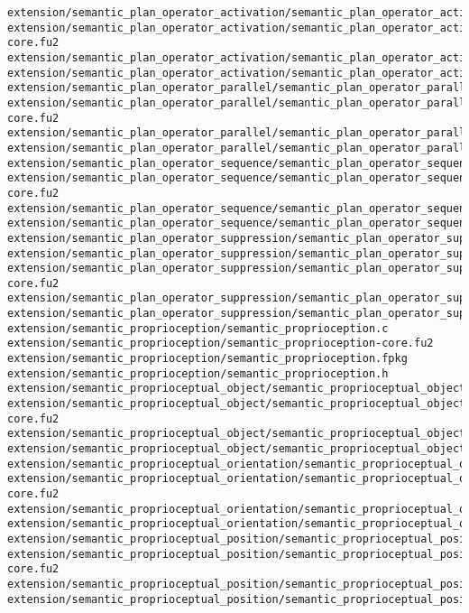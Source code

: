 \begin{lstlisting}
extension/semantic_plan_operator_activation/semantic_plan_operator_activation.c
extension/semantic_plan_operator_activation/semantic_plan_operator_activation-core.fu2
extension/semantic_plan_operator_activation/semantic_plan_operator_activation.fpkg
extension/semantic_plan_operator_activation/semantic_plan_operator_activation.h
extension/semantic_plan_operator_parallel/semantic_plan_operator_parallel.c
extension/semantic_plan_operator_parallel/semantic_plan_operator_parallel-core.fu2
extension/semantic_plan_operator_parallel/semantic_plan_operator_parallel.fpkg
extension/semantic_plan_operator_parallel/semantic_plan_operator_parallel.h
extension/semantic_plan_operator_sequence/semantic_plan_operator_sequence.c
extension/semantic_plan_operator_sequence/semantic_plan_operator_sequence-core.fu2
extension/semantic_plan_operator_sequence/semantic_plan_operator_sequence.fpkg
extension/semantic_plan_operator_sequence/semantic_plan_operator_sequence.h
extension/semantic_plan_operator_suppression/semantic_plan_operator_suppession.fpkg
extension/semantic_plan_operator_suppression/semantic_plan_operator_suppression.c
extension/semantic_plan_operator_suppression/semantic_plan_operator_suppression-core.fu2
extension/semantic_plan_operator_suppression/semantic_plan_operator_suppression.fpkg
extension/semantic_plan_operator_suppression/semantic_plan_operator_suppression.h
extension/semantic_proprioception/semantic_proprioception.c
extension/semantic_proprioception/semantic_proprioception-core.fu2
extension/semantic_proprioception/semantic_proprioception.fpkg
extension/semantic_proprioception/semantic_proprioception.h
extension/semantic_proprioceptual_object/semantic_proprioceptual_object.c
extension/semantic_proprioceptual_object/semantic_proprioceptual_object-core.fu2
extension/semantic_proprioceptual_object/semantic_proprioceptual_object.fpkg
extension/semantic_proprioceptual_object/semantic_proprioceptual_object.h
extension/semantic_proprioceptual_orientation/semantic_proprioceptual_orientation.c
extension/semantic_proprioceptual_orientation/semantic_proprioceptual_orientation-core.fu2
extension/semantic_proprioceptual_orientation/semantic_proprioceptual_orientation.fpkg
extension/semantic_proprioceptual_orientation/semantic_proprioceptual_orientation.h
extension/semantic_proprioceptual_position/semantic_proprioceptual_position.c
extension/semantic_proprioceptual_position/semantic_proprioceptual_position-core.fu2
extension/semantic_proprioceptual_position/semantic_proprioceptual_position.fpkg
extension/semantic_proprioceptual_position/semantic_proprioceptual_position.h

\end{lstlisting}
